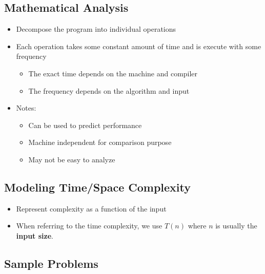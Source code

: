 \documentclass[10pt]{article}
\begin{document}
\subsection*{Mathematical Analysis}
\begin{itemize}
\item Decompose the program into individual operations
\item Each operation takes some constant amount of time and is execute with some frequency
\begin{itemize}
\item The exact time depends on the machine and compiler
\item The frequency depends on the algorithm and input
\end{itemize}
\item Notes:
\begin{itemize}
\item Can be used to predict performance
\item Machine independent for comparison purpose
\item May not be easy to analyze
\end{itemize}
\end{itemize}
\subsection*{Modeling Time/Space Complexity}
\begin{itemize}
\item Represent complexity as a function of the input
\item When referring to the time complexity, we use $T(n)$ where $n$ is usually the \textbf{input size}.
\end{itemize}

\subsection*{Sample Problems}
\end{document}
